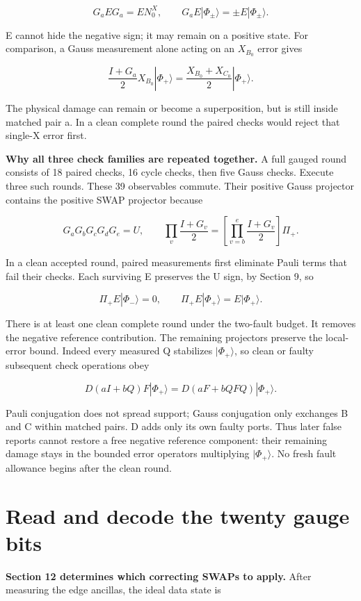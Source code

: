 \documentclass[11pt]{article}
\begin{document}
\[
G_aEG_a=E N_0^X,\qquad
G_aE|\Phi_\pm\rangle=\pm E|\Phi_\pm\rangle.
\]

E cannot hide the negative sign; it may remain on a positive state. For comparison, a Gauss measurement alone acting on an \(X_{B_0}\) error gives

\[
\frac{I+G_a}{2}X_{B_0}|\Phi_+\rangle
=\frac{X_{B_0}+X_{C_0}}2|\Phi_+\rangle.
\]

The physical damage can remain or become a superposition, but is still inside matched pair a. In a clean complete round the paired checks would reject that single-X error first.

\textbf{Why all three check families are repeated together.} A full gauged round consists of 18 paired checks, 16 cycle checks, then five Gauss checks. Execute three such rounds. These 39 observables commute. Their positive Gauss projector contains the positive SWAP projector because

\[
G_aG_bG_cG_dG_e=U,\qquad
\prod_v\frac{I+G_v}{2}=\left[\prod_{v=b}^e\frac{I+G_v}{2}\right]\Pi_+.
\]

In a clean accepted round, paired measurements first eliminate Pauli terms that fail their checks. Each surviving E preserves the U sign, by Section 9, so

\[
\Pi_+E|\Phi_-\rangle=0,\qquad
\Pi_+E|\Phi_+\rangle=E|\Phi_+\rangle.
\]

There is at least one clean complete round under the two-fault budget. It removes the negative reference contribution. The remaining projectors preserve the local-error bound. Indeed every measured Q stabilizes \(|\Phi_+\rangle\), so clean or faulty subsequent check operations obey

\[
D(aI+bQ)F|\Phi_+\rangle=D(aF+bQFQ)|\Phi_+\rangle.
\]

Pauli conjugation does not spread support; Gauss conjugation only exchanges B and C within matched pairs. D adds only its own faulty ports. Thus later false reports cannot restore a free negative reference component: their remaining damage stays in the bounded error operators multiplying \(|\Phi_+\rangle\). No fresh fault allowance begins after the clean round.

\section{Read and decode the twenty gauge bits}
\textbf{Section 12 determines which correcting SWAPs to apply.} After measuring the edge ancillas, the ideal data state is
\end{document}
